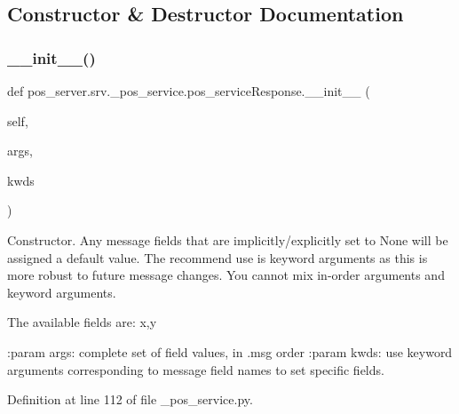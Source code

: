 \subsection{Constructor \& Destructor Documentation}
\mbox{\label{classpos__server_1_1srv_1_1__pos__service_1_1pos__serviceResponse_ad18922282c847215e4ac28d1c3cfb1fa}} 
\subsubsection{\texorpdfstring{\+\_\+\+\_\+init\+\_\+\+\_\+()}{\_\_init\_\_()}}
{\footnotesize\ttfamily def pos\+\_\+server.\+srv.\+\_\+pos\+\_\+service.\+pos\+\_\+service\+Response.\+\_\+\+\_\+init\+\_\+\+\_\+ (\begin{DoxyParamCaption}\item[{}]{self,  }\item[{}]{args,  }\item[{}]{kwds }\end{DoxyParamCaption})}

\begin{DoxyVerb}Constructor. Any message fields that are implicitly/explicitly
set to None will be assigned a default value. The recommend
use is keyword arguments as this is more robust to future message
changes.  You cannot mix in-order arguments and keyword arguments.

The available fields are:
   x,y

:param args: complete set of field values, in .msg order
:param kwds: use keyword arguments corresponding to message field names
to set specific fields.
\end{DoxyVerb}
 

Definition at line 112 of file \+\_\+pos\+\_\+service.\+py.


